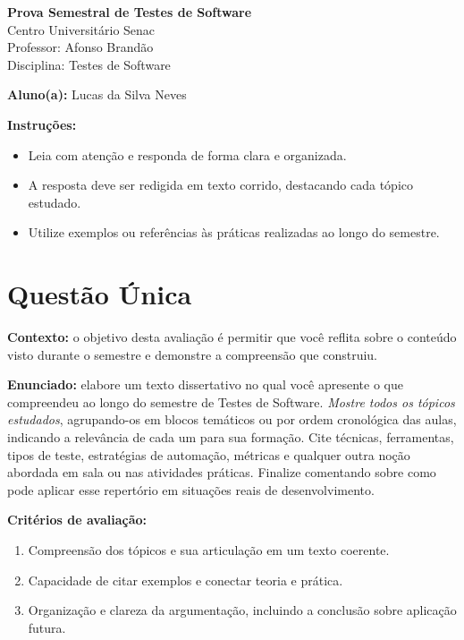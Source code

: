 \documentclass[12pt]{article}
\begin{document}
\newpage


\begin{center}
  {\Large \textbf{Prova Semestral de Testes de Software}}\\
  Centro Universitário Senac\\
  Professor: Afonso Brandão\\
  Disciplina: Testes de Software
\end{center}

\vspace{0.4cm}

\begin{center}
  \textbf{Aluno(a):} Lucas da Silva Neves
\end{center}

\vspace{0.5cm}

\begin{center}
  \textbf{Instruções:}
\end{center}
\begin{itemize}[leftmargin=*]
  \item Leia com atenção e responda de forma clara e organizada.
  \item A resposta deve ser redigida em texto corrido, destacando cada tópico estudado.
  \item Utilize exemplos ou referências às práticas realizadas ao longo do semestre.
\end{itemize}

\section*{Questão Única}
\textbf{Contexto:} o objetivo desta avaliação é permitir que você reflita sobre o conteúdo visto durante o semestre e demonstre a compreensão que construiu.

\textbf{Enunciado:} elabore um texto dissertativo no qual você apresente o que compreendeu ao longo do semestre de Testes de Software. \textit{Mostre todos os tópicos estudados}, agrupando-os em blocos temáticos ou por ordem cronológica das aulas, indicando a relevância de cada um para sua formação. Cite técnicas, ferramentas, tipos de teste, estratégias de automação, métricas e qualquer outra noção abordada em sala ou nas atividades práticas. Finalize comentando sobre como pode aplicar esse repertório em situações reais de desenvolvimento.

\textbf{Critérios de avaliação:}
\begin{enumerate}[label=\arabic*.]
  \item Compreensão dos tópicos e sua articulação em um texto coerente.
  \item Capacidade de citar exemplos e conectar teoria e prática.
  \item Organização e clareza da argumentação, incluindo a conclusão sobre aplicação futura.
\end{enumerate}
\end{document}
